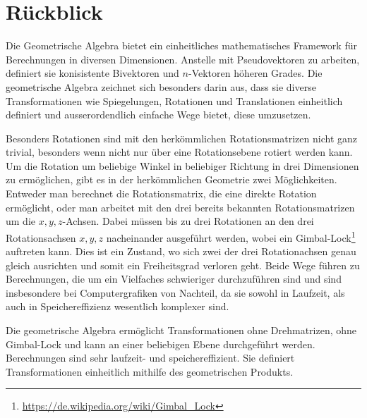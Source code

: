 \section{Rückblick}
Die Geometrische Algebra bietet ein einheitliches mathematisches Framework für Berechnungen
in diversen Dimensionen. Anstelle mit Pseudovektoren zu arbeiten, definiert sie konisistente
Bivektoren und $n$-Vektoren höheren Grades. Die geometrische Algebra zeichnet sich besonders
darin aus, dass sie diverse Transformationen wie Spiegelungen, Rotationen und Translationen
einheitlich definiert und ausserordendlich einfache Wege bietet, diese umzusetzen.

Besonders Rotationen sind mit den herkömmlichen Rotationsmatrizen nicht ganz trivial, besonders wenn
nicht nur über eine Rotationsebene rotiert werden kann. Um die Rotation um beliebige Winkel in beliebiger
Richtung in drei Dimensionen zu ermöglichen, gibt es in der herkömmlichen Geometrie zwei Möglichkeiten. Entweder
man berechnet die Rotationsmatrix, die eine direkte Rotation ermöglicht, oder man arbeitet mit den drei bereits bekannten
Rotationsmatrizen um die $x, y, z$-Achsen. Dabei müssen bis zu drei
Rotationen an den drei Rotationsachsen $x, y, z$ nacheinander ausgeführt werden, wobei ein
Gimbal-Lock\footnote{\url{https://de.wikipedia.org/wiki/Gimbal_Lock}} auftreten kann. Dies ist ein Zustand, wo sich zwei der drei Rotationachsen genau gleich ausrichten und somit ein Freiheitsgrad verloren geht.
Beide Wege führen zu Berechnungen, die um ein Vielfaches
schwieriger durchzuführen sind und sind insbesondere bei Computergrafiken von Nachteil, da sie sowohl in Laufzeit,
als auch in Speichereffizienz wesentlich komplexer sind.

Die geometrische Algebra ermöglicht Transformationen ohne Drehmatrizen, ohne Gimbal-Lock und kann an einer beliebigen
Ebene durchgeführt werden. Berechnungen sind sehr laufzeit- und speichereffizient.
Sie definiert Transformationen einheitlich mithilfe des geometrischen Produkts.
